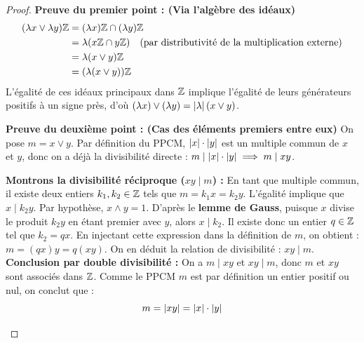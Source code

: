 \documentclass[12pt, a4paper]{report}
\begin{document}
\begin{proof}
    \textbf{Preuve du premier point : (Via l'algèbre des idéaux)}
    \begin{align*}
        (\lambda x \vee \lambda y)\mathbb{Z} &= (\lambda x)\mathbb{Z} \cap (\lambda y)\mathbb{Z} \\
        &= \lambda (x\mathbb{Z} \cap y\mathbb{Z}) \quad \text{(par distributivité de la multiplication externe)} \\
        &= \lambda (x \vee y)\mathbb{Z} \\
        &= (\lambda (x \vee y))\mathbb{Z}
    \end{align*}
    L'égalité de ces idéaux principaux dans $\mathbb{Z}$ implique l'égalité de leurs générateurs positifs à un signe près, d'où $(\lambda x) \vee (\lambda y) = \left|\lambda\right| (x \vee y)$.

    \textbf{Preuve du deuxième point : (Cas des éléments premiers entre eux)}
    On pose $m = x \vee y$. Par définition du PPCM, $\left|x\right|\cdot\left|y\right|$ est un multiple commun de $x$ et $y$, donc on a déjà la divisibilité directe : $m \mid \left|x\right|\cdot\left|y\right| \implies m \mid xy$.
    \begin{outline}
        \1 \textbf{Montrons la divisibilité réciproque ($xy \mid m$) :}
            \2 En tant que multiple commun, il existe deux entiers $k_1, k_2 \in \mathbb{Z}$ tels que $m = k_1 x = k_2 y$.
            \2 L'égalité implique que $x \mid k_2 y$.
            \2 Par hypothèse, $x \wedge y = 1$. D'après le \textbf{lemme de Gauss}, puisque $x$ divise le produit $k_2 y$ en étant premier avec $y$, alors $x \mid k_2$.
            \2 Il existe donc un entier $q \in \mathbb{Z}$ tel que $k_2 = q x$.
            \2 En injectant cette expression dans la définition de $m$, on obtient : $m = (qx)y = q(xy)$.
            \2 On en déduit la relation de divisibilité : $xy \mid m$.
        \1 \textbf{Conclusion par double divisibilité :}
            \2 On a $m \mid xy$ et $xy \mid m$, donc $m$ et $xy$ sont associés dans $\mathbb{Z}$.
            \2 Comme le PPCM $m$ est par définition un entier positif ou nul, on conclut que :
               \[ m = \left|xy\right| = \left|x\right|\cdot\left|y\right| \]
    \end{outline}


\end{proof}
\end{document}
